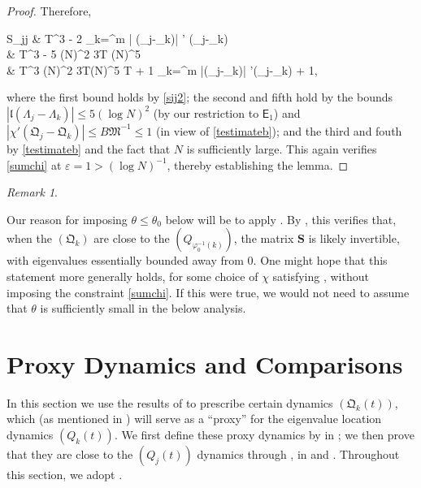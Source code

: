 \documentclass{amsart}
\numberwithin{equation}{section}
\theoremstyle{remark}
\newtheorem{rem}[thm]{Remark}
\theoremstyle{definition}
\begin{document}
\begin{proof}
			 \noindent Therefore,
			\begin{flalign*}
				S_{jj} & \ge T^3 -  2  \displaystyle\sum_{k=\ell}^{m} | (\Lambda_j-\Lambda_k)| \cdot \chi' (\mathfrak{Q}_j-_k) \\
				& \ge T^3 - 5 (\log N)^2 \cdot 3T (\log N)^5   \\
				& \ge \displaystyle{} \cdot T^3   (\log N)^2 \cdot 3T(\log N)^5 \cdot T + 1   \displaystyle\sum_{k=\ell}^{m} |(\Lambda_j-\Lambda_k)| \cdot \chi'(_j-_k) + 1,
			\end{flalign*}
			
			\noindent where the first bound holds by \eqref{sij2}; the second and fifth hold by the bounds $|\mathfrak{l}(\Lambda_j-\Lambda_k)| \le 5 (\log N)^2$ (by our restriction to $\mathsf{E}_1$) and $|\chi'(_j-\mathfrak{Q}_k)| \le B \mathfrak{M}^{-1} \le 1$ (in view of \eqref{testimateb}); and the third and fouth by \eqref{testimateb} and the fact that $N$ is sufficiently large. This again verifies \eqref{sumchi} at $\varepsilon = 1 > (\log N)^{-1}$, thereby establishing the lemma.
		\end{proof}
		
		
		\begin{rem} 
			
			\label{smatrixchi} 
			
			Our reason for imposing $\theta \le \theta_0$ below will be to apply . By , this verifies that, when the $(\mathfrak{Q}_k)$ are close to the $(Q_{\varphi_0^{-1} (k)})$, the matrix $\bm{S}$ is likely invertible, with eigenvalues essentially bounded away from $0$. One might hope that this statement more generally holds, for some choice of $\chi$ satisfying , without imposing the constraint \eqref{sumchi}. If this were true, we would not need to assume that $\theta$ is sufficiently small in the below analysis.  
			
		\end{rem} 
		
		
		
	\section{Proxy Dynamics and Comparisons}
	
	\label{DynamicsQ}
	
	In this section we use the results of  to prescribe certain dynamics $(\mathfrak{Q}_k (t))$, which (as mentioned in ) will serve as a ``proxy'' for the eigenvalue location dynamics $(Q_k (t))$. We first define these proxy dynamics by  in ; we then prove that they are close to the $(Q_j(t))$ dynamics through , in  and . Throughout this section, we adopt . 
	
\end{document}
